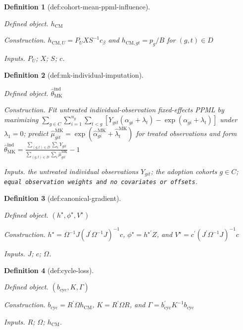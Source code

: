 \documentclass{article}
\newtheorem{definition}{Definition}
\begin{document}
\begin{definition}[def:cohort-mean-ppml-influence]\label{def:cohort-mean-ppml-influence}
\par\smallskip\noindent\emph{Defined object.} \(h_{\mathrm{CM}}\)
\par\smallskip\noindent\emph{Construction.} \(h_{\mathrm{CM},U}=P_UXS^{-1}c_{\beta}\) and \(h_{\mathrm{CM},gt}=p_g/B\) for \((g,t)\in D\)
\par\smallskip\noindent\emph{Inputs.} \(P_U\); \(X\); \(S\); \(c\).
\end{definition}

\begin{definition}[def:mk-individual-imputation]\label{def:mk-individual-imputation}
\par\smallskip\noindent\emph{Defined object.} \(\widehat\theta_{\mathrm{MK}}^{\mathrm{ind}}\)
\par\smallskip\noindent\emph{Construction.} Fit untreated individual-observation fixed-effects PPML by maximizing \(\sum_{g\in C}\sum_{i=1}^{n_g}\sum_{t<g}[Y_{git}(\alpha_{gi}+\lambda_t)-\exp(\alpha_{gi}+\lambda_t)]\) under \(\lambda_1=0\); predict \(\widehat\mu^{\mathrm{MK}}_{git}=\exp(\widehat\alpha^{\mathrm{MK}}_{gi}+\widehat\lambda^{\mathrm{MK}}_t)\) for treated observations and form \(\widehat\theta_{\mathrm{MK}}^{\mathrm{ind}}=\frac{\sum_{(g,t)\in D}\sum_iY_{git}}{\sum_{(g,t)\in D}\sum_i\widehat\mu^{\mathrm{MK}}_{git}}-1\)
\par\smallskip\noindent\emph{Inputs.} the untreated individual observations \(Y_{git}\); the adoption cohorts \(g\in C\); \texttt{equal observation weights and no covariates or offsets}.
\end{definition}

\begin{definition}[def:canonical-gradient]\label{def:canonical-gradient}
\par\smallskip\noindent\emph{Defined object.} \((h^{\star},\phi^{\star},V^{\star})\)
\par\smallskip\noindent\emph{Construction.} \(h^{\star}=\Omega^{-1}J(J^{\prime}\Omega^{-1}J)^{-1}c\), \(\phi^{\star}=h^{\star\prime}Z\), and \(V^{\star}=c^{\prime}(J^{\prime}\Omega^{-1}J)^{-1}c\)
\par\smallskip\noindent\emph{Inputs.} \(J\); \(c\); \(\Omega\).
\end{definition}

\begin{definition}[def:cycle-loss]\label{def:cycle-loss}
\par\smallskip\noindent\emph{Defined object.} \((b_{\mathrm{cyc}},K,\Gamma)\)
\par\smallskip\noindent\emph{Construction.} \(b_{\mathrm{cyc}}=R^{\prime}\Omega h_{\mathrm{CM}}\), \(K=R^{\prime}\Omega R\), and \(\Gamma=b_{\mathrm{cyc}}^{\prime}K^{-1}b_{\mathrm{cyc}}\)
\par\smallskip\noindent\emph{Inputs.} \(R\); \(\Omega\); \(h_{\mathrm{CM}}\).
\end{definition}
\end{document}
